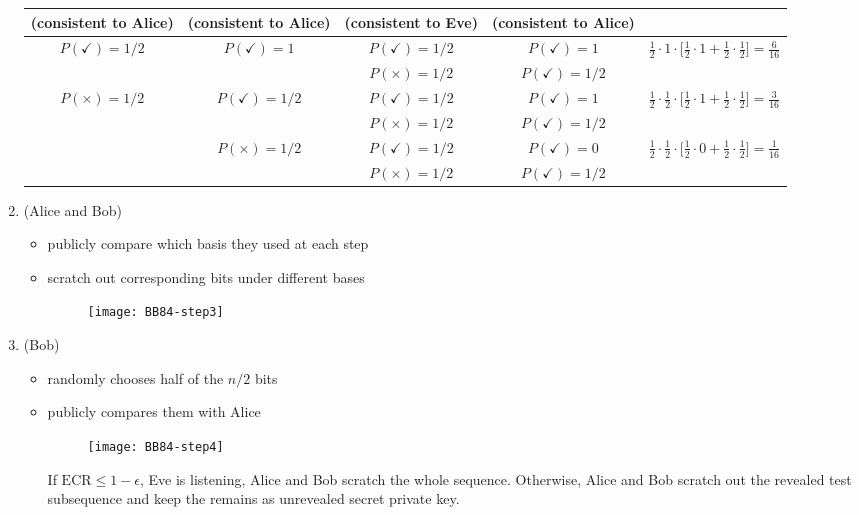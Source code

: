 \documentclass{easyclass}
\begin{document}
\begin{enumerate}
\begin{table}[h]
{\begin{tabular}{c|c|c|c|c}
			\textbf{(consistent to Alice)} & 
			\textbf{(consistent to Alice)} & 
			\textbf{(consistent to Eve)} & 
			\textbf{(consistent to Alice)} & 
			\\
			\hline
			\hline
			\multirow{2}{*}{$P(\checkmark) = 1/2$} & 
			\multirow{2}{*}{$P(\checkmark) = 1$} & 
			$P(\checkmark) = 1/2$ & 
			$P(\checkmark) = 1$ & 
			\multirow{2}{*}{\Large$\frac{1}{2}\cdot 1\cdot\Big[\frac{1}{2}\cdot1+\frac{1}{2}\cdot\frac{1}{2}\Big]=\frac{6}{16}$} \\
			\cline{3-4}
			&&
			$P(\times) = 1/2$ & 
			$P(\checkmark) = 1/2$ & 
			\\
			
			\hline
			\multirow{4}{*}{$P(\times) = 1/2$} & 
			\multirow{2}{*}{$P(\checkmark) = 1/2$} & 
			$P(\checkmark) = 1/2$ & 
			$P(\checkmark) = 1$ & 
			\multirow{2}{*}{\Large$\frac{1}{2}\cdot \frac{1}{2}\cdot\Big[\frac{1}{2}\cdot1+\frac{1}{2}\cdot\frac{1}{2}\Big]=\frac{3}{16}$} \\
			\cline{3-4}
			&&
			$P(\times) = 1/2$ & 
			$P(\checkmark) = 1/2$ & 
			\\
			\cline{2-5}
			
			&\multirow{2}{*}{$P(\times) = 1/2$} & 
			$P(\checkmark) = 1/2$ & 
			$P(\checkmark) = 0$ & 
			\multirow{2}{*}{\Large$\frac{1}{2}\cdot \frac{1}{2}\cdot\Big[\frac{1}{2}\cdot0+\frac{1}{2}\cdot\frac{1}{2}\Big]=\frac{1}{16}$} \\
			\cline{3-4}
			&&
			$P(\times) = 1/2$ & 
			$P(\checkmark) = 1/2$ & 
			\\
			\hline
			\hline
	\end{tabular}}
\end{table}
	
		

		
	\item (Alice and Bob)
		\begin{itemize}
			\item publicly compare which basis they used at each step
			\item scratch out corresponding bits under different bases
			\begin{figure}[h]
				\centering
				\texttt{[image: BB84-step3]}
				\label{fig:BB84-step3}
			\end{figure}
		\end{itemize}
	\item (Bob)
		\begin{itemize}
			\item randomly chooses half of the $n/2$ bits
			\item publicly compares them with Alice
			\begin{figure}[h]
				\centering
				\texttt{[image: BB84-step4]}
				\label{fig:BB84-step4}
			\end{figure}

			If $\textrm{ECR}\leq 1-\epsilon$, Eve is listening, Alice and Bob scratch the whole sequence. Otherwise, Alice and Bob scratch out the revealed test subsequence and keep the remains as unrevealed secret private key.			
		\end{itemize}
\end{enumerate}
\end{document}
